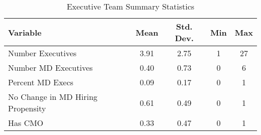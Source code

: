 \begin{table}[ht!]
\centering
\caption{\label{leader_sumstats}Executive Team Summary Statistics}
\centering
\begin{tabular}[t]{lcccc}
\toprule
Variable & Mean & Std. Dev. & Min & Max\\
\midrule
Number Executives & 3.91 & 2.75 & 1 & 27\\
Number MD Executives & 0.40 & 0.73 & 0 & 6\\
Percent MD Execs & 0.09 & 0.17 & 0 & 1\\
No Change in MD Hiring Propensity & 0.61 & 0.49 & 0 & 1\\
Has CMO & 0.33 & 0.47 & 0 & 1\\
\bottomrule
\end{tabular}
\end{table}
